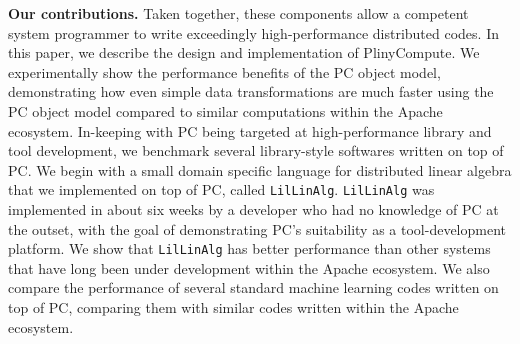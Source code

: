 \vspace{5 pt}
\noindent
\textbf{Our contributions.}
Taken together, these components allow a competent system programmer to write exceedingly high-performance distributed codes.
In this paper, we describe the design and implementation of PlinyCompute.  We experimentally show the performance benefits of the PC object model, 
demonstrating how even simple data transformations are much faster using the PC object model compared to similar computations within the 
Apache ecosystem.
In-keeping with PC being targeted at high-performance
library and tool development,
we benchmark several library-style softwares written on top of PC.  We begin with a small domain specific language
for distributed linear algebra that we implemented on top of PC, called \texttt{LilLinAlg}.  \texttt{LilLinAlg} was implemented in about six weeks by a developer
who had no knowledge of PC at the outset, with the goal of demonstrating PC's suitability as a tool-development platform.  
We show that \texttt{LilLinAlg} has better performance than other systems that have long been under development
within the Apache ecosystem.   
We also compare the performance of several standard machine learning codes written on top of PC, comparing them with similar
codes written within the Apache ecosystem.  


